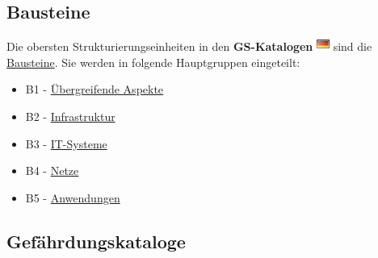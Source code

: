 \documentclass[a4paper,10pt]{book}
\begin{document}
\subsection{Bausteine}
Die obersten Strukturierungseinheiten in den \textbf{GS-Katalogen} \includegraphics[height=2ex]{Icon/GS_Kataloge.png} sind die \href{https://www.bsi.bund.de/cln_156/DE/Themen/weitereThemen/ITGrundschutzKataloge/Inhalt/Bausteine/bausteine_node.html}{Bausteine}. Sie werden in folgende Hauptgruppen eingeteilt:
\begin{itemize}
\item B1 -
  \href{https://www.bsi.bund.de/cln_156/DE/Themen/weitereThemen/ITGrundschutzKataloge/Inhalt/Bausteine/B1uebergeordneteAspekte/b1uebergeordneteaspekte_node.html}{Übergreifende
    Aspekte}
\item B2 - \href{https://www.bsi.bund.de/cln_156/DE/Themen/weitereThemen/ITGrundschutzKataloge/Inhalt/Bausteine/B2Infrastruktur/b2infrastruktur_node.html}{Infrastruktur}
\item B3 - \href{https://www.bsi.bund.de/cln_156/DE/Themen/weitereThemen/ITGrundschutzKataloge/Inhalt/Bausteine/B3ITSysteme/b3itsysteme_node.html}{IT-Systeme}
\item B4 - \href{https://www.bsi.bund.de/cln_156/DE/Themen/weitereThemen/ITGrundschutzKataloge/Inhalt/Bausteine/B4Netze/b4netze_node.html}{Netze}
\item B5 - \href{https://www.bsi.bund.de/cln_156/DE/Themen/weitereThemen/ITGrundschutzKataloge/Inhalt/Bausteine/B5Anwendungen/b5anwendungen_node.html}{Anwendungen}
\end{itemize}
\subsection{Gefährdungskataloge}
\end{document}
